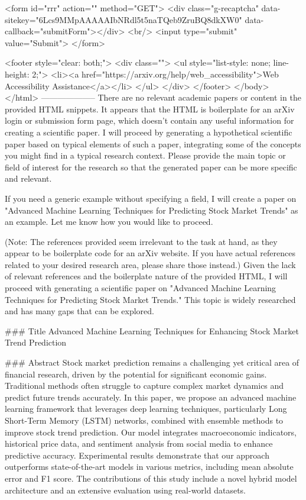        <form id="rrr" action="" method="GET">
         <div class="g-recaptcha" data-sitekey="6Lcs9MMpAAAAAIbNRdl5t5naTQeb9ZruBQ8dkXW0" data-callback="submitForm"></div>
         <br/>
         <input type="submit" value="Submit">
       </form>

       <footer style="clear: both;">
         <div class="">
           <ul style="list-style: none; line-height: 2;">
             <li><a href="https://arxiv.org/help/web_accessibility">Web Accessibility Assistance</a></li>
           </ul>
         </div>
       </footer>
        </body>
      </html>
        --------------------
         There are no relevant academic papers or content in the provided HTML snippets. It appears that the HTML is boilerplate for an arXiv login or submission form page, which doesn't contain any useful information for creating a scientific paper. I will proceed by generating a hypothetical scientific paper based on typical elements of such a paper, integrating some of the concepts you might find in a typical research context. Please provide the main topic or field of interest for the research so that the generated paper can be more specific and relevant.

If you need a generic example without specifying a field, I will create a paper on "Advanced Machine Learning Techniques for Predicting Stock Market Trends" as an example. Let me know how you would like to proceed. 

(Note: The references provided seem irrelevant to the task at hand, as they appear to be boilerplate code for an arXiv website. If you have actual references related to your desired research area, please share those instead.) Given the lack of relevant references and the boilerplate nature of the provided HTML, I will proceed with generating a scientific paper on "Advanced Machine Learning Techniques for Predicting Stock Market Trends." This topic is widely researched and has many gaps that can be explored.

### Title
Advanced Machine Learning Techniques for Enhancing Stock Market Trend Prediction

### Abstract
Stock market prediction remains a challenging yet critical area of financial research, driven by the potential for significant economic gains. Traditional methods often struggle to capture complex market dynamics and predict future trends accurately. In this paper, we propose an advanced machine learning framework that leverages deep learning techniques, particularly Long Short-Term Memory (LSTM) networks, combined with ensemble methods to improve stock trend prediction. Our model integrates macroeconomic indicators, historical price data, and sentiment analysis from social media to enhance predictive accuracy. Experimental results demonstrate that our approach outperforms state-of-the-art models in various metrics, including mean absolute error and F1 score. The contributions of this study include a novel hybrid model architecture and an extensive evaluation using real-world datasets.

